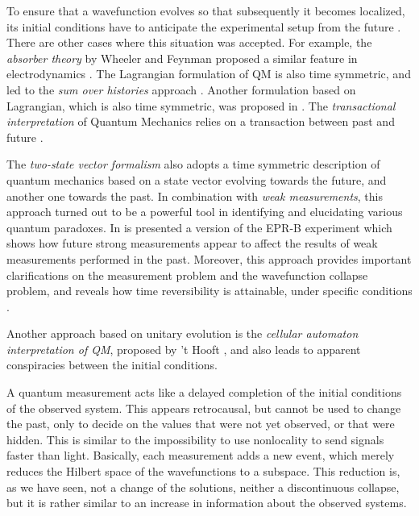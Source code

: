 \documentclass[11pt]{amsart}
\theoremstyle{definition}
\theoremstyle{plain}
\begin{document}
To ensure that a wavefunction evolves so that subsequently it becomes localized, its initial conditions have to anticipate the experimental setup from the future \cite{Sto12QMb}. There are other cases where this situation was accepted. For example, the \emph{absorber theory} by Wheeler and Feynman proposed a similar feature in electrodynamics \cite{WheelerFeynman1945AbsorberTheory,WheelerFeynman1949ClassicalElectrodynamicsAbsorber}.
The Lagrangian formulation of QM is also time symmetric, and led to the \emph{sum over histories} approach \cite{Feynman1948SpaceTimeApproachToQM,FeynmanHibbs1965QMAndPathIntegrals}. Another formulation based on Lagrangian, which is also time symmetric, was proposed in \cite{Wharton2007TimeSymmetricQM}.
The \emph{transactional interpretation} of Quantum Mechanics relies on a transaction between past and future \cite{cramer1986transactional,cramer1988overview}.

The \textit{two-state vector formalism} \cite{aharonov1964time,aharonov1988result,aharonov1991complete,aharonov2007newinsights,aharonov2007TSV} also adopts a time symmetric description of quantum mechanics based on a state vector evolving towards the future, and another one towards the past.
In combination with \emph{weak measurements}, this approach turned out to be a powerful tool in identifying and elucidating various quantum paradoxes. In \cite{aharonov2012future-past} is presented a version of the EPR-B experiment which shows how future strong measurements appear to affect the results of weak measurements performed in the past. Moreover, this approach provides important clarifications on the measurement problem and the wavefunction collapse problem, and reveals how time reversibility is attainable, under specific conditions \cite{AharonovCohen2014MeasurementCollapse}.

Another approach based on unitary evolution is the \emph{cellular automaton interpretation of QM}, proposed by 't Hooft \cite{tH07,tHooft2014CellularAutomatonInterpretationQM,Elze2014Action4CellularAutomata}, and also leads to apparent conspiracies between the initial conditions.

A quantum measurement acts like a delayed completion of the initial conditions of the observed system. This appears retrocausal, but cannot be used to change the past, only to decide on the values that were not yet observed, or that were hidden. This is similar to the impossibility to use nonlocality to send signals faster than light.
Basically, each measurement adds a new event, which merely reduces the Hilbert space of the wavefunctions to a subspace. This reduction is, as we have seen, not a change of the solutions, neither a discontinuous collapse, but it is rather similar to an increase in information about the observed systems.
\end{document}
